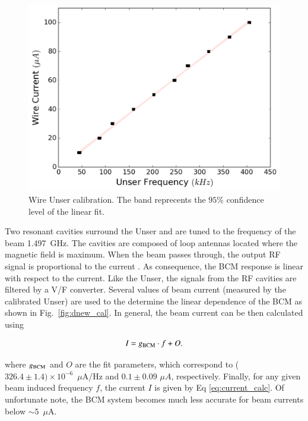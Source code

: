 \documentclass[final,5p,times,twocolumn]{elsarticle}
\begin{document}
\begin{figure}[!h]
    \centering
    \includegraphics[width=\linewidth]{images/unser_calibration.pdf}
    \caption{Wire Unser calibration. The band reprecents the $95\%$ confidence level of the linear fit.}
    \label{fig:unser_cal}
\end{figure}
  
Two resonant cavities surround the Unser and are tuned to the frequency of the beam 1.497~GHz.
The cavities are composed of loop antennas located where the magnetic field is maximum. 
When the beam passes through, the output RF signal is proportional to the current \cite{Denard:2001zg}. 
As consequence, the BCM response is linear with respect to the current. Like the Unser, the signals 
from the RF cavities are filtered by a V/F converter. Several values of beam current (measured by the 
calibrated Unser) are used to the determine the linear dependence of the BCM as shown in 
Fig.~\ref{fig:dnew_cal}.  In general, the beam current can be then calculated using

\begin{equation}
I = g_{\rm{BCM}}\cdot f+O.
\label{eq:current_calc}
\end{equation}

\noindent where $g_{\rm{BCM}}$ and $O$ are the fit parameters, which correspond 
to ($326.4 \pm 1.4) \times 10^{-6}$~$\mu$A/Hz 
and $0.1 \pm 0.09$  $\mu A$, respectively. Finally, for any given beam induced frequency $f$, the 
current $I$ is given by Eq \ref{eq:current_calc}. Of unfortunate note, the BCM system becomes much 
less accurate for beam currents below $\sim 5$~$\mu$A.
  
\end{document}
